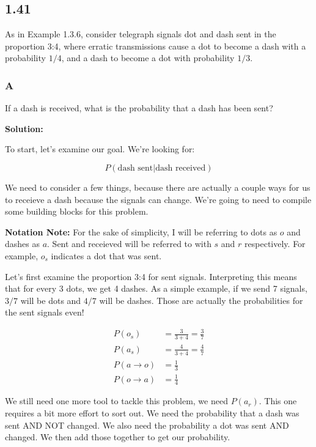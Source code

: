\subsection*{1.41}

As in Example 1.3.6, consider telegraph signals dot and dash sent in the proportion 3:4, where erratic transmissions cause a dot to become a dash with a probability $1/4$, and a dash to become a dot with probability $1/3$.

\subsubsection*{A}

If a dash is received, what is the probability that a dash has been sent?

\noindent \textbf{Solution:}

To start, let's examine our goal. We're looking for:

\[P(\text{dash sent} | \text{dash received})\]

We need to consider a few things, because there are actually a couple ways for us to receieve a dash because the signals can change. We're going to need to compile some building blocks for this problem.

\textbf{Notation Note:} For the sake of simplicity, I will be referring to dots as $o$ and dashes as $a$. Sent and receieved will be referred to with $s$ and $r$ respectively. For example, $o_s$ indicates a dot that was sent.

Let's first examine the proportion 3:4 for sent signals. Interpreting this means that for every 3 dots, we get 4 dashes. As a simple example, if we send 7 signals, $3/7$ will be dots and $4/7$ will be dashes. Those are actually the probabilities for the sent signals even!

\begin{align*}
	P(o_s) &= \frac{3}{3+4} = \frac{3}{7} \\
	P(a_s) &= \frac{4}{3+4} = \frac{4}{7} \\
	P(a \rightarrow o) &= \frac{1}{3} \\
	P(o \rightarrow a) &= \frac{1}{4}
\end{align*}

We still need one more tool to tackle this problem, we need $P(a_r)$. This one requires a bit more effort to sort out. We need the probability that a dash was sent AND NOT changed. We also need the probability a dot was sent AND changed. We then add those together to get our probability.

